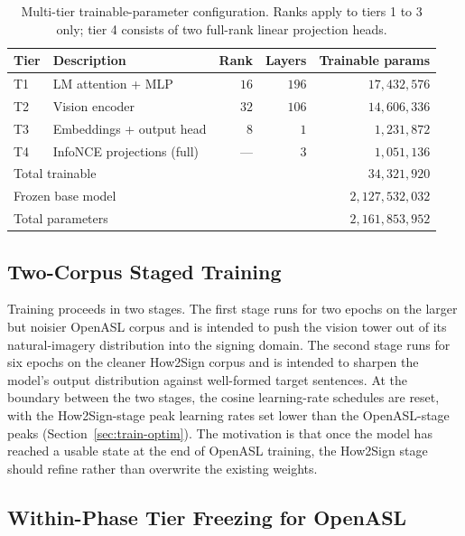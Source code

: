\documentclass{article}
\begin{document}
\begin{table}[h]
\centering
\caption{Multi-tier trainable-parameter configuration. Ranks apply to
tiers 1 to 3 only; tier 4 consists of two full-rank linear projection heads.}
\label{tab:lora-tiers}
\begin{tabular}{l l r r r}
\toprule
Tier & Description                    & Rank & Layers & Trainable params \\
\midrule
T1   & LM attention + MLP             & $16$ & $196$  & $17{,}432{,}576$ \\
T2   & Vision encoder                 & $32$ & $106$  & $14{,}606{,}336$ \\
T3   & Embeddings + output head       & $8$  & $1$    & $1{,}231{,}872$  \\
T4   & InfoNCE projections (full)     & ---  & $3$    & $1{,}051{,}136$  \\
\midrule
\multicolumn{4}{l}{Total trainable}                   & $34{,}321{,}920$ \\
\multicolumn{4}{l}{Frozen base model}                 & $2{,}127{,}532{,}032$ \\
\multicolumn{4}{l}{Total parameters}                  & $2{,}161{,}853{,}952$ \\
\bottomrule
\end{tabular}
\end{table}

\subsection{Two-Corpus Staged Training}
\label{sec:train-stages}

Training proceeds in two stages. The first stage runs for two epochs on the
larger but noisier OpenASL corpus and is intended to push the vision tower
out of its natural-imagery distribution into the signing domain. The second
stage runs for six epochs on the cleaner How2Sign corpus and is intended to
sharpen the model's output distribution against well-formed target sentences.
At the boundary between the two stages, the cosine learning-rate schedules
are reset, with the How2Sign-stage peak learning rates set lower than the
OpenASL-stage peaks (Section~\ref{sec:train-optim}). The motivation is that
once the model has reached a usable state at the end of OpenASL training,
the How2Sign stage should refine rather than overwrite the existing weights.

\subsection{Within-Phase Tier Freezing for OpenASL}
\label{sec:train-freeze}
\end{document}
